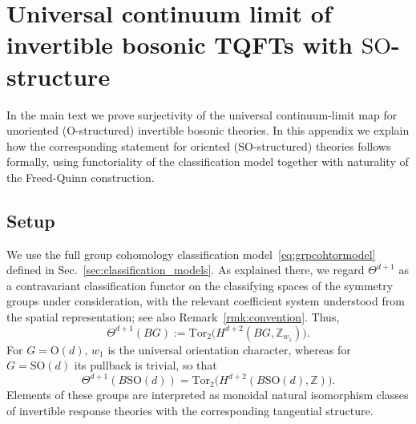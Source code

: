 \documentclass[aps,prx,reprint,superscriptaddress,twocolumn,amsmath,amssymb,amsfonts, nofootinbib]{revtex4-2}
\newcommand{\SO}{\text{SO}}
\newcommand{\tor}{\text{Tor}}
\theoremstyle{apsstyle}
\begin{document}
\section{Universal continuum limit of invertible bosonic TQFTs with $\SO$-structure}
\label{app:so_str}

In the main text we prove surjectivity of the universal continuum-limit map for unoriented ($\mathrm O$-structured) invertible bosonic theories. In this appendix we explain how the corresponding statement for oriented ($\mathrm{SO}$-structured) theories follows formally, using functoriality of the classification model together with naturality of the Freed-Quinn construction.

\subsection{Setup}

We use the full group cohomology classification model~\eqref{eq:grpcohtormodel} defined in Sec.~\ref{sec:classification_models}. As explained there, we regard $\Theta^{d+1}$ as a contravariant classification functor on the classifying spaces of the symmetry groups under consideration, with the relevant coefficient system understood from the spatial representation; see also Remark~\ref{rmk:convention}. Thus,
\begin{equation*}
    \Theta^{d+1}(BG)
    :=
    \tor_2\bigl(
        H^{d+2}(BG,\mathbb Z_{w_1})
    \bigr).
\end{equation*}
For $G=\mathrm O(d)$, $w_1$ is the universal orientation character, whereas for $G=\SO(d)$ its pullback is trivial, so that
\begin{equation*}
    \Theta^{d+1}(B\SO(d))
    =
    \tor_2\bigl(
        H^{d+2}(B\SO(d),\mathbb Z)
    \bigr).
\end{equation*}
Elements of these groups are interpreted as monoidal natural isomorphism classes of invertible response theories with the corresponding tangential structure.

\bigskip 
\end{document}
